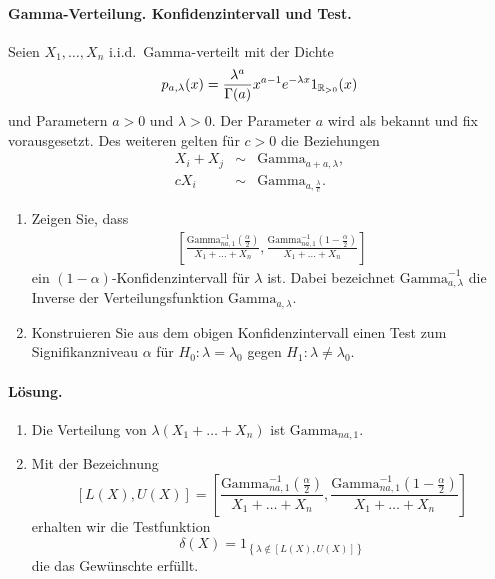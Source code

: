 \paragraph{Gamma-Verteilung. Konfidenzintervall und Test.}
Seien $X_1, \ldots, X_n$ i.i.d.\ Gamma-verteilt mit der Dichte
\begin{equation*}
    p_{a,\lambda} (x) = \frac{\lambda^a}{ \Gamma(a)} x^{a-1} e^{-\lambda x} 1_{ \mathbb R_{>0}  } (x)
\end{equation*} 
und Parametern $a>0$ und $\lambda>0$. Der Parameter $a$ wird als bekannt und fix vorausgesetzt. 
Des weiteren gelten für $c>0$ die Beziehungen
\begin{eqnarray*}
    X_i + X_j &\sim& \textrm{Gamma}_{a+a, \lambda}, \\
    c X_i & \sim & \textrm{Gamma}_{a, \frac{\lambda}{c}}.
\end{eqnarray*}
\begin{enumerate}
    \item Zeigen Sie, dass \begin{eqnarray*}
            \left[  \frac{ \textrm{Gamma}^{-1}_{na, 1} ( \frac{\alpha}{2})  }{X_1 + \ldots + X_n}, 
            \frac{ \textrm{Gamma}^{-1}_{na, 1} ( 1- \frac{\alpha}{2})  }{X_1+ \ldots + X_n}  \right]
        \end{eqnarray*} ein $(1-\alpha)$-Konfidenzintervall für $\lambda$ ist.
        Dabei bezeichnet $\textrm{Gamma}^{-1}_{a,\lambda}$ die Inverse der Verteilungsfunktion 
        $\textrm{Gamma}_{a,\lambda}$.
    \item Konstruieren Sie aus dem obigen Konfidenzintervall einen Test zum Signifikanzniveau
        $\alpha$ für $H_0: \lambda=\lambda_0$ gegen $H_1: \lambda\neq \lambda_0$.
\end{enumerate} 

\paragraph*{Lösung.}
\begin{enumerate}
    \item Die Verteilung von $\lambda (X_1 + \ldots + X_n)$ ist $\textrm{Gamma}_{na, 1}$.
    \item Mit der Bezeichnung 
        \begin{equation*}
            \left[ L(X), U(X) \right] = 
            \left[  \frac{ \textrm{Gamma}^{-1}_{na, 1} ( \frac{\alpha}{2})  }{X_1 + \ldots + X_n}, 
            \frac{ \textrm{Gamma}^{-1}_{na, 1} ( 1- \frac{\alpha}{2})  }{X_1+ \ldots + X_n}  \right]
        \end{equation*}
        erhalten wir die Testfunktion
        \begin{equation*}
            \delta(X) = 1_{ \left\{ \lambda \nin \left[ L(X), U(X) \right] \right\}   }
        \end{equation*} die das Gewünschte erfüllt. 
\end{enumerate}












